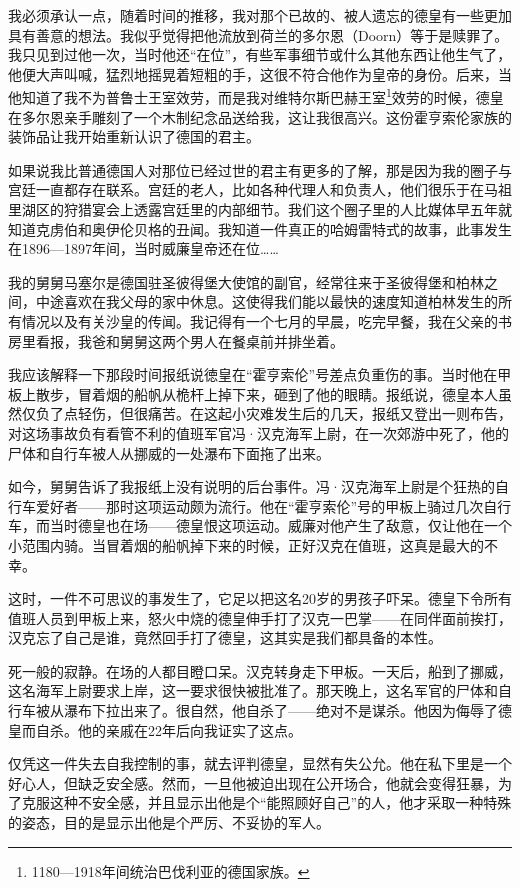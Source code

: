 \documentclass[UTF8]{ctexart}
\begin{document}
我必须承认一点，随着时间的推移，我对那个已故的、被人遗忘的德皇有一些更加具有善意的想法。我似乎觉得把他流放到荷兰的多尔恩（Doorn）等于是赎罪了。我只见到过他一次，当时他还“在位”，有些军事细节或什么其他东西让他生气了，他便大声叫喊，猛烈地摇晃着短粗的手，这很不符合他作为皇帝的身份。后来，当他知道了我不为普鲁士王室效劳，而是我对维特尔斯巴赫王室\footnote{1180—1918年间统治巴伐利亚的德国家族。}效劳的时候，德皇在多尔恩亲手雕刻了一个木制纪念品送给我，这让我很高兴。这份霍亨索伦家族的装饰品让我开始重新认识了德国的君主。

如果说我比普通德国人对那位已经过世的君主有更多的了解，那是因为我的圈子与宫廷一直都存在联系。宫廷的老人，比如各种代理人和负责人，他们很乐于在马祖里湖区的狩猎宴会上透露宫廷里的内部细节。我们这个圈子里的人比媒体早五年就知道克虏伯和奥伊伦贝格的丑闻。我知道一件真正的哈姆雷特式的故事，此事发生在1896—1897年间，当时威廉皇帝还在位……

我的舅舅马塞尔是德国驻圣彼得堡大使馆的副官，经常往来于圣彼得堡和柏林之间，中途喜欢在我父母的家中休息。这使得我们能以最快的速度知道柏林发生的所有情况以及有关沙皇的传闻。我记得有一个七月的早晨，吃完早餐，我在父亲的书房里看报，我爸和舅舅这两个男人在餐桌前并排坐着。

我应该解释一下那段时间报纸说徳皇在“霍亨索伦”号差点负重伤的事。当时他在甲板上散步，冒着烟的船帆从桅杆上掉下来，砸到了他的眼睛。报纸说，德皇本人虽然仅负了点轻伤，但很痛苦。在这起小灾难发生后的几天，报纸又登出一则布告，对这场事故负有看管不利的值班军官冯·汉克海军上尉，在一次郊游中死了，他的尸体和自行车被人从挪威的一处瀑布下面拖了出来。

如今，舅舅告诉了我报纸上没有说明的后台事件。冯·汉克海军上尉是个狂热的自行车爱好者——那时这项运动颇为流行。他在“霍亨索伦”号的甲板上骑过几次自行车，而当时德皇也在场——德皇恨这项运动。威廉对他产生了敌意，仅让他在一个小范围内骑。当冒着烟的船帆掉下来的时候，正好汉克在值班，这真是最大的不幸。

这时，一件不可思议的事发生了，它足以把这名20岁的男孩子吓呆。德皇下令所有值班人员到甲板上来，怒火中烧的德皇伸手打了汉克一巴掌——在同伴面前挨打，汉克忘了自己是谁，竟然回手打了德皇，这其实是我们都具备的本性。

死一般的寂静。在场的人都目瞪口呆。汉克转身走下甲板。一天后，船到了挪威，这名海军上尉要求上岸，这一要求很快被批准了。那天晚上，这名军官的尸体和自行车被从瀑布下拉出来了。很自然，他自杀了——绝对不是谋杀。他因为侮辱了德皇而自杀。他的亲戚在22年后向我证实了这点。

仅凭这一件失去自我控制的事，就去评判德皇，显然有失公允。他在私下里是一个好心人，但缺乏安全感。然而，一旦他被迫出现在公开场合，他就会变得狂暴，为了克服这种不安全感，并且显示出他是个“能照顾好自己”的人，他才采取一种特殊的姿态，目的是显示出他是个严厉、不妥协的军人。
\end{document}
